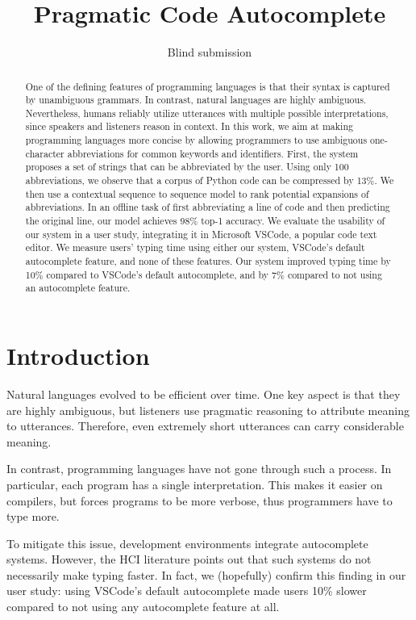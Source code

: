 \documentclass[letterpaper]{article} %
\title{Pragmatic Code Autocomplete}
\author{
  Blind submission
}
\begin{document}
\maketitle

\begin{abstract}
  One of the defining features of programming languages is that their syntax
  is captured by unambiguous grammars. In contrast, natural languages are
  highly ambiguous. Nevertheless, humans reliably utilize utterances with multiple
  possible interpretations, since speakers and listeners reason in context.
  In this work, we aim
  at making programming languages more concise by allowing programmers to use
  ambiguous one-character abbreviations for common keywords and identifiers.
  First, the system proposes a set of strings that can be abbreviated by the user.
  Using only 100 abbreviations, we observe that a corpus of Python code can
  be compressed by 13\%.
  We then use a contextual sequence to sequence model to rank potential expansions of
  abbreviations. In an offline task of first abbreviating a line of code and then
  predicting the original line, our model achieves 98\% top-1 accuracy.
  We evaluate the usability of our system in a user study, integrating it in
  Microsoft VSCode, a popular code text editor.
  We measure users' typing time using either our system, VSCode's default autocomplete
  feature, and none of these features. Our system improved typing time
  by 10\% compared to VSCode's default autocomplete, and by 7\% compared to not
  using an autocomplete feature.
\end{abstract}

\section{Introduction}

Natural languages evolved to be efficient over time.
One key aspect is that they are highly ambiguous, but listeners use
pragmatic reasoning to attribute meaning to utterances.
Therefore, even extremely short utterances can carry considerable meaning.

In contrast, programming languages have not gone through such a process.
In particular, each program has a single interpretation.
This makes it easier on compilers, but forces programs to be more verbose,
thus programmers have to type more.

To mitigate this issue, development environments integrate autocomplete systems.
However, the HCI literature points out that such systems do not necessarily make
typing faster. In fact, we (hopefully) confirm this finding in our user
study: using VSCode's default autocomplete made users 10\% slower compared
to not using any autocomplete feature at all.
\end{document}
